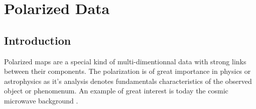 

\chapter{Polarized Data}
\label{ch_intro_pola}
 
\section{Introduction}

Polarized maps are a special kind of multi-dimentionnal data with strong links between their components. The polarization is of great importance 
in physics or astrophysics as it's analysis denotes fundamentals characteristics of the observed object or phenomenum. An example of great interest 
is today the cosmic microwave background \citep{zalda,dasi}.\\

